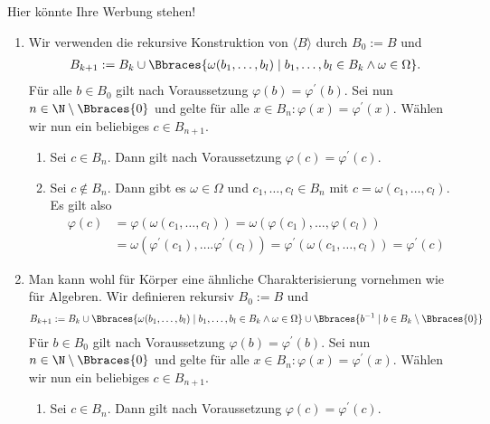 \begin{solution}
    Hier könnte Ihre Werbung stehen!
    \begin{enumerate}[label = (\roman*)]
        \item Wir verwenden die rekursive Konstruktion von $\langle B \rangle$ durch $B_0 := B$ und
        \begin{align*}
            B_{k + 1} := B_k \cup \Bbraces{\omega(b_1, \dots, b_l) \mid b_1, \dots, b_l \in B_k \land \omega \in \Omega}.
        \end{align*}
        Für alle $b \in B_0$ gilt nach Voraussetzung $\varphi(b) = \varphi^\prime(b)$. Sei nun $n \in \N \setminus \Bbraces{0}$ und gelte für alle $x \in B_n: \varphi(x) = \varphi^\prime(x)$. Wählen wir nun ein beliebiges $c \in B_{n + 1}$. 
        \begin{enumerate}[label = Fall \arabic*:]
            \item Sei $c \in B_n$. Dann gilt nach Voraussetzung $\varphi(c) = \varphi^\prime(c)$. 
            \item Sei $c \notin B_n$. Dann gibt es $\omega \in \Omega$ und $c_1, \dots, c_l \in B_n$ mit $c = \omega(c_1, \dots, c_l)$. Es gilt also
            \begin{align*}
                \varphi(c) &= \varphi(\omega(c_1, \dots, c_l)) = \omega(\varphi(c_1), \dots, \varphi(c_l)) \\
                &= \omega(\varphi^\prime(c_1), \dots. \varphi^\prime(c_l)) = \varphi^\prime(\omega(c_1, \dots, c_l)) = \varphi^\prime(c)
            \end{align*}
        \end{enumerate}
        \item Man kann wohl für Körper eine ähnliche Charakterisierung vornehmen wie für Algebren. Wir definieren rekursiv $B_0 := B$ und 
        \begin{align*}
            B_{k+1} := B_k \cup \Bbraces{\omega(b_1, \dots, b_l) \mid b_1, \dots, b_l \in B_k \land \omega \in \Omega} \cup \Bbraces{b^{-1} \mid b \in B_k \setminus \Bbraces{0}}
        \end{align*}
        Für $b \in B_0$ gilt nach Voraussetzung $\varphi(b) = \varphi^\prime(b)$. Sei nun $n \in \N \setminus \Bbraces{0}$ und gelte für alle $x \in B_n: \varphi(x) = \varphi^\prime(x)$. Wählen wir nun ein beliebiges $c \in B_{n + 1}$.
        \begin{enumerate}[label = Fall \arabic*:]
            \item Sei $c \in B_n$. Dann gilt nach Voraussetzung $\varphi(c) = \varphi^\prime(c)$. 

\end{enumerate}
\end{enumerate}
\end{solution}
